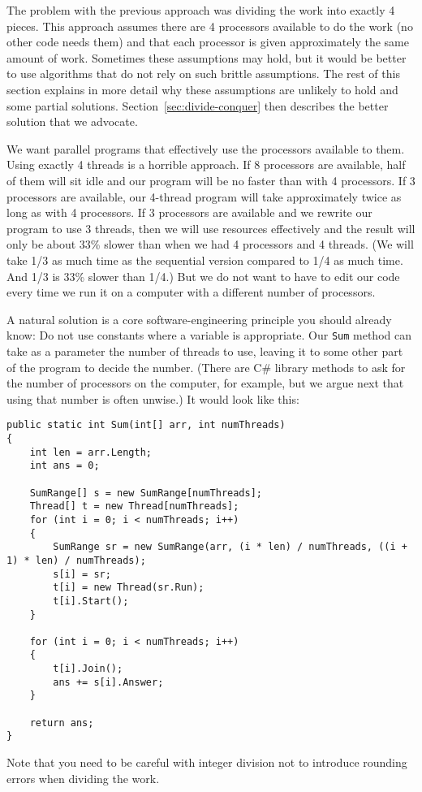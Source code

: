 \documentclass[10pt]{article}
\begin{document}
The problem with the previous approach was dividing the work into
exactly 4 pieces.  This approach assumes there are 4 processors
available to do the work (no other code needs them) and that each
processor is given approximately the same amount of work.  Sometimes
these assumptions may hold, but it would be better to use algorithms
that do not rely on such brittle assumptions.  The rest of this
section explains in more detail why these assumptions are unlikely to
hold and some partial solutions.  Section~\ref{sec:divide-conquer}
then describes the better solution that we advocate.

\medskip
{}
\medskip

We want parallel programs that effectively use the processors
available to them.  Using exactly 4 threads is a horrible approach.
If 8 processors are available, half of them will sit idle and our
program will be no faster than with 4 processors.  If 3 processors are
available, our 4-thread program will take approximately twice as long
as with 4 processors. If 3 processors are available and we rewrite our
program to use 3 threads, then we will use resources effectively and
the result will only be about 33\% slower than when we had 4
processors and 4 threads.  (We will take 1/3 as much time as the
sequential version compared to 1/4 as much time.  And 1/3 is 33\%
slower than 1/4.)  But we do not want to have to edit our code every
time we run it on a computer with a different number of processors.

A natural solution is a core software-engineering principle you
should already know: Do not use constants where a variable is 
appropriate.  Our {\tt Sum} method can take as a parameter the number
of threads to use, leaving it to some other part of the program to
decide the number.  (There are C\# library methods to ask for the
number of processors on the computer, for example, but we argue next
that using that number is often unwise.)  It would look like this:
\begin{verbatim}
public static int Sum(int[] arr, int numThreads)
{
    int len = arr.Length;
    int ans = 0;

    SumRange[] s = new SumRange[numThreads];
    Thread[] t = new Thread[numThreads];
    for (int i = 0; i < numThreads; i++)
    {
        SumRange sr = new SumRange(arr, (i * len) / numThreads, ((i + 1) * len) / numThreads);
        s[i] = sr;
        t[i] = new Thread(sr.Run);
        t[i].Start();
    }

    for (int i = 0; i < numThreads; i++)
    {
        t[i].Join();
        ans += s[i].Answer;
    }

    return ans;
}
\end{verbatim}
Note that you need to be careful with integer division not to
introduce rounding errors when dividing the work.
\end{document}
